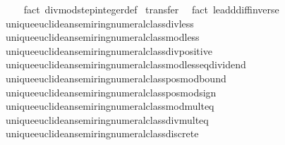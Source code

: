 \begin{isabellebody}
\ \ \ \ \isamarkupfalse%
\ {\isacharparenleft}{\kern0pt}fact\ divmod{\isacharunderscore}{\kern0pt}step{\isacharunderscore}{\kern0pt}integer{\isacharunderscore}{\kern0pt}def{\isacharparenright}{\kern0pt}\isanewline
{}\isamarkupfalse%
\ {\isacharparenleft}{\kern0pt}transfer{\isacharcomma}{\kern0pt}\isanewline
\ \ fact\ le{\isacharunderscore}{\kern0pt}add{\isacharunderscore}{\kern0pt}diff{\isacharunderscore}{\kern0pt}inverse{}\isanewline
\ \ unique{\isacharunderscore}{\kern0pt}euclidean{\isacharunderscore}{\kern0pt}semiring{\isacharunderscore}{\kern0pt}numeral{\isacharunderscore}{\kern0pt}class{\isachardot}{\kern0pt}div{\isacharunderscore}{\kern0pt}less\isanewline
\ \ unique{\isacharunderscore}{\kern0pt}euclidean{\isacharunderscore}{\kern0pt}semiring{\isacharunderscore}{\kern0pt}numeral{\isacharunderscore}{\kern0pt}class{\isachardot}{\kern0pt}mod{\isacharunderscore}{\kern0pt}less\isanewline
\ \ unique{\isacharunderscore}{\kern0pt}euclidean{\isacharunderscore}{\kern0pt}semiring{\isacharunderscore}{\kern0pt}numeral{\isacharunderscore}{\kern0pt}class{\isachardot}{\kern0pt}div{\isacharunderscore}{\kern0pt}positive\isanewline
\ \ unique{\isacharunderscore}{\kern0pt}euclidean{\isacharunderscore}{\kern0pt}semiring{\isacharunderscore}{\kern0pt}numeral{\isacharunderscore}{\kern0pt}class{\isachardot}{\kern0pt}mod{\isacharunderscore}{\kern0pt}less{\isacharunderscore}{\kern0pt}eq{\isacharunderscore}{\kern0pt}dividend\isanewline
\ \ unique{\isacharunderscore}{\kern0pt}euclidean{\isacharunderscore}{\kern0pt}semiring{\isacharunderscore}{\kern0pt}numeral{\isacharunderscore}{\kern0pt}class{\isachardot}{\kern0pt}pos{\isacharunderscore}{\kern0pt}mod{\isacharunderscore}{\kern0pt}bound\isanewline
\ \ unique{\isacharunderscore}{\kern0pt}euclidean{\isacharunderscore}{\kern0pt}semiring{\isacharunderscore}{\kern0pt}numeral{\isacharunderscore}{\kern0pt}class{\isachardot}{\kern0pt}pos{\isacharunderscore}{\kern0pt}mod{\isacharunderscore}{\kern0pt}sign\isanewline
\ \ unique{\isacharunderscore}{\kern0pt}euclidean{\isacharunderscore}{\kern0pt}semiring{\isacharunderscore}{\kern0pt}numeral{\isacharunderscore}{\kern0pt}class{\isachardot}{\kern0pt}mod{\isacharunderscore}{\kern0pt}mult{}{\isacharunderscore}{\kern0pt}eq\isanewline
\ \ unique{\isacharunderscore}{\kern0pt}euclidean{\isacharunderscore}{\kern0pt}semiring{\isacharunderscore}{\kern0pt}numeral{\isacharunderscore}{\kern0pt}class{\isachardot}{\kern0pt}div{\isacharunderscore}{\kern0pt}mult{}{\isacharunderscore}{\kern0pt}eq\isanewline
\ \ unique{\isacharunderscore}{\kern0pt}euclidean{\isacharunderscore}{\kern0pt}semiring{\isacharunderscore}{\kern0pt}numeral{\isacharunderscore}{\kern0pt}class{\isachardot}{\kern0pt}discrete{\isacharparenright}{\kern0pt}{\isacharplus}{\kern0pt}%

\end{isabellebody}
